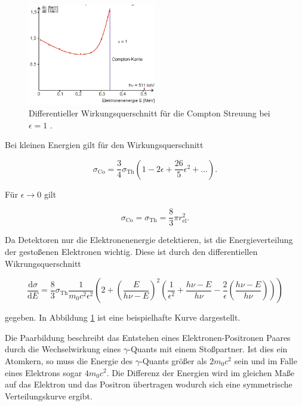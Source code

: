 \begin{figure}
	\centering
	\includegraphics[width = 0.5\textwidth]{pic/compton2.png}
	\caption{Differentieller Wirkungsquerschnitt für die Compton Streuung bei $\epsilon = 1$ \cite{anleitung}.}
	\label{compton2}
\end{figure}
Bei kleinen Energien gilt für den Wirkungsquerschnitt

\begin{equation}
	\sigma_\text{Co} = \frac{3}{4} \sigma_\text{Th} \left(1 - 2\epsilon + \frac{26}{5} \epsilon^2 + ...\right) .
\end{equation}

Für $\epsilon \rightarrow 0$ gilt

\begin{equation}
	\sigma_\text{Co} = \sigma_\text{Th} = \frac{8}{3} \pi r_\text{el}^2 . 
\end{equation}

Da Detektoren nur die Elektronenenergie detektieren, ist die Energieverteilung der gestoßenen Elektronen wichtig.
Diese ist durch den differentiellen Wikrungsquerschnitt 

\begin{equation}
	\frac{\text{d}\sigma}{\text{d}E} = \frac{8}{3}\sigma_\text{Th} \frac{1}{m_\text{0} c^2 \epsilon^2} \left(2 + \left(\frac{E}{h \nu - E}\right)^2 \left(\frac{1}{\epsilon^2} + \frac{h \nu - E}{h \nu} - \frac{2}{\epsilon} \left(\frac{h \nu - E}{h \nu}\right)\right)\right) \label{eqn:dsde}
\end{equation}

gegeben.
In Abbildung \ref{compton2} ist eine beispielhafte Kurve dargestellt.\\
\FloatBarrier

Die Paarbildung beschreibt das Entstehen eines Elektronen-Positronen Paares durch die Wechselwirkung eines $\gamma$-Quants mit einem Stoßpartner.
Ist dies ein Atomkern, so muss die Energie des $\gamma$-Quants größer als $2 m_\text{0} c^2$ sein und im Falle eines Elektrons sogar $4 m_\text{0} c^2$.
Die Differenz der Energien wird im gleichen Maße auf das Elektron und das Positron übertragen wodurch sich eine symmetrische Verteilungskurve ergibt.

